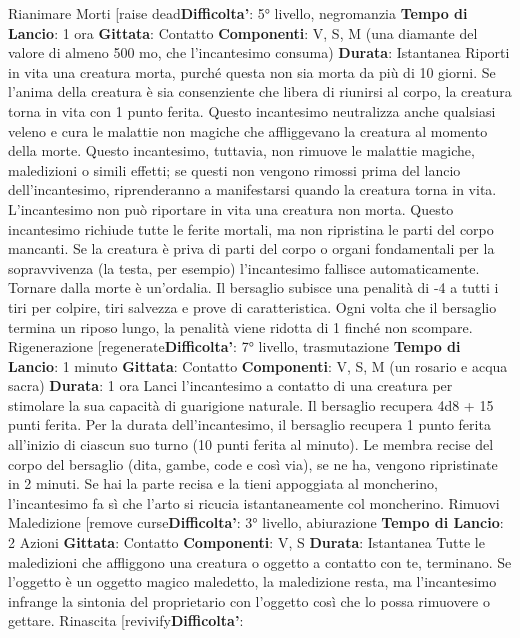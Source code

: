 \begin{multicols}{2}
Rianimare Morti
[raise dead\textbf{Difficolta'}:
5° livello, negromanzia
\textbf{Tempo di Lancio}: 1 ora
\textbf{Gittata}: Contatto
\textbf{Componenti}: V, S, M (una diamante del valore di
almeno 500 mo, che l’incantesimo consuma)
\textbf{Durata}: Istantanea
Riporti in vita una creatura morta, purché questa non
sia morta da più di 10 giorni. Se l’anima della creatura è
sia consenziente che libera di riunirsi al corpo, la
creatura torna in vita con 1 punto ferita.
Questo incantesimo neutralizza anche qualsiasi veleno
e cura le malattie non magiche che affliggevano la
creatura al momento della morte. Questo incantesimo,
tuttavia, non rimuove le malattie magiche, maledizioni o
simili effetti; se questi non vengono rimossi prima del
lancio dell’incantesimo, riprenderanno a manifestarsi
quando la creatura torna in vita. L’incantesimo non può
riportare in vita una creatura non morta.
Questo incantesimo richiude tutte le ferite mortali, ma
non ripristina le parti del corpo mancanti. Se la creatura
è priva di parti del corpo o organi fondamentali per la
sopravvivenza (la testa, per esempio) l’incantesimo
fallisce automaticamente.
Tornare dalla morte è un’ordalia. Il bersaglio subisce
una penalità di -4 a tutti i tiri per colpire, tiri salvezza e
prove di caratteristica. Ogni volta che il bersaglio
termina un riposo lungo, la penalità viene ridotta di 1
finché non scompare.
Rigenerazione
[regenerate\textbf{Difficolta'}:
7° livello, trasmutazione
\textbf{Tempo di Lancio}: 1 minuto
\textbf{Gittata}: Contatto
\textbf{Componenti}: V, S, M (un rosario e acqua sacra)
\textbf{Durata}: 1 ora
Lanci l’incantesimo a contatto di una creatura per
stimolare la sua capacità di guarigione naturale. Il
bersaglio recupera 4d8 + 15 punti ferita. Per la durata
dell’incantesimo, il bersaglio recupera 1 punto ferita
all’inizio di ciascun suo turno (10 punti ferita al minuto).
Le membra recise del corpo del bersaglio (dita, gambe,
code e così via), se ne ha, vengono ripristinate in 2
minuti. Se hai la parte recisa e la tieni appoggiata al
moncherino, l’incantesimo fa sì che l’arto si ricucia
istantaneamente col moncherino.
Rimuovi Maledizione
[remove curse\textbf{Difficolta'}:
3° livello, abiurazione
\textbf{Tempo di Lancio}: 2 Azioni
\textbf{Gittata}: Contatto
\textbf{Componenti}: V, S
\textbf{Durata}: Istantanea
Tutte le maledizioni che affliggono una creatura o
oggetto a contatto con te, terminano. Se l’oggetto è un
oggetto magico maledetto, la maledizione resta, ma
l’incantesimo infrange la sintonia del proprietario con
l’oggetto così che lo possa rimuovere o gettare.
Rinascita
[revivify\textbf{Difficolta'}:

\end{multicols}
